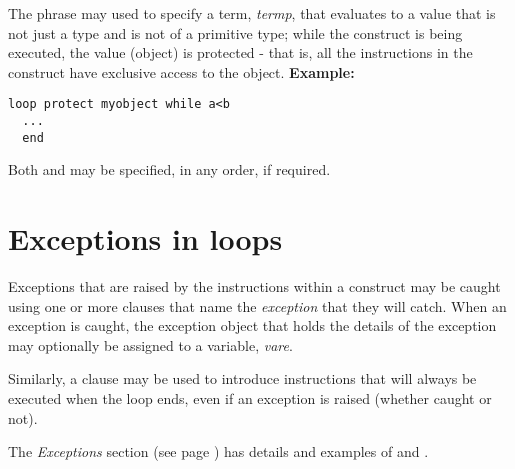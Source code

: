 The  phrase may used to specify a term,
\emph{termp}, that evaluates to a value that is not just a type and
is not of a primitive type;
while the  construct is being executed, the value (object)
is protected - that is, all the instructions in the 
construct have exclusive access to the object.
 \textbf{Example:}
\begin{lstlisting}
loop protect myobject while a<b
  ...
  end
\end{lstlisting}
 
Both  and  may be specified, in any order,
if required.
\section{Exceptions in loops}
 
Exceptions that are raised by the instructions within a 
construct may be caught using one or more  clauses that
name the \emph{exception} that they will catch.  When an exception is
caught, the exception object that holds the details of the exception may
optionally be assigned to a variable, \emph{vare}.
 
Similarly, a  clause may be used to introduce
instructions that will always be executed when the loop ends, even if an
exception is raised (whether caught or not).
 
The  \emph{Exceptions} section (see page \pageref{refexcep})  has details and
examples of  and .
